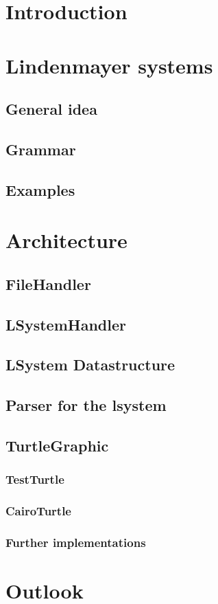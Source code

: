 \documentclass[german]{cpp-hmwk}
\begin{document}
   \section{Introduction}
   \section{Lindenmayer systems}
   \subsection{General idea}
   \subsection{Grammar}
   \subsection{Examples}
   \section{Architecture}
   \subsection{FileHandler}
   \subsection{LSystemHandler}
   \subsection{LSystem Datastructure}
   \subsection{Parser for the lsystem}
   \subsection{TurtleGraphic}
   \subsubsection{TestTurtle}
   \subsubsection{CairoTurtle}
   \subsubsection{Further implementations}
   \section{Outlook}
\end{document}
